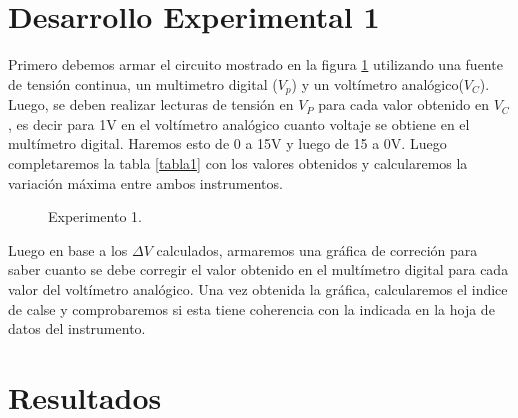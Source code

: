\section{Desarrollo Experimental 1}
Primero debemos armar el circuito mostrado en la figura \ref{circuito1} utilizando una fuente de tensión continua, un multimetro digital ($V_p$) y un voltímetro analógico($V_C$). Luego, se deben realizar lecturas de tensión en $V_P$ para cada valor obtenido en $V_C$, es decir para 1V en el voltímetro analógico cuanto voltaje se obtiene en el multímetro digital. Haremos esto de 0 a 15V y luego de 15 a 0V. Luego completaremos la tabla \ref{tabla1} con los valores obtenidos y calcularemos la variación máxima entre ambos instrumentos.

\vspace{1cm}

\begin{figure}[H]
\centering
{}
\begingroup
\renewcommand{\figurename}{Circuito}
\caption{Experimento 1.}
\label{circuito1}
\endgroup
\end{figure}

Luego en base a los $\Delta V$ calculados, armaremos una gráfica de correción para saber cuanto se debe corregir el valor obtenido en el multímetro digital para cada valor del voltímetro analógico. Una vez obtenida la gráfica, calcularemos el indice de calse y comprobaremos si esta tiene coherencia con la indicada en la hoja de datos del instrumento.

\section{Resultados}


